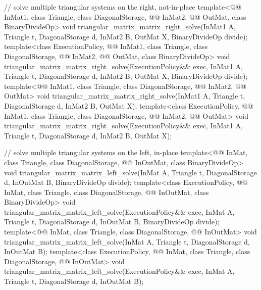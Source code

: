 \begin{codeblock}
{  // solve multiple triangular systems on the right, not-in-place
  template<@@ InMat1, class Triangle, class DiagonalStorage,
           @@ InMat2, @@ OutMat, class BinaryDivideOp>
    void triangular_matrix_matrix_right_solve(InMat1 A, Triangle t, DiagonalStorage d,
                                              InMat2 B, OutMat X, BinaryDivideOp divide);
  template<class ExecutionPolicy,
           @@ InMat1, class Triangle, class DiagonalStorage,
           @@ InMat2, @@ OutMat, class BinaryDivideOp>
    void triangular_matrix_matrix_right_solve(ExecutionPolicy&& exec,
                                              InMat1 A, Triangle t, DiagonalStorage d,
                                              InMat2 B, OutMat X, BinaryDivideOp divide);
  template<@@ InMat1, class Triangle, class DiagonalStorage,
           @@ InMat2, @@ OutMat>
    void triangular_matrix_matrix_right_solve(InMat1 A, Triangle t, DiagonalStorage d,
                                              InMat2 B, OutMat X);
  template<class ExecutionPolicy,
           @@ InMat1, class Triangle, class DiagonalStorage,
           @@ InMat2, @@ OutMat>
    void triangular_matrix_matrix_right_solve(ExecutionPolicy&& exec,
                                              InMat1 A, Triangle t, DiagonalStorage d,
                                              InMat2 B, OutMat X);

  // solve multiple triangular systems on the left, in-place
  template<@@ InMat, class Triangle, class DiagonalStorage,
           @@ InOutMat, class BinaryDivideOp>
    void triangular_matrix_matrix_left_solve(InMat A, Triangle t, DiagonalStorage d,
                                             InOutMat B, BinaryDivideOp divide);
  template<class ExecutionPolicy,
           @@ InMat, class Triangle, class DiagonalStorage,
           @@ InOutMat, class BinaryDivideOp>
    void triangular_matrix_matrix_left_solve(ExecutionPolicy&& exec,
                                             InMat A, Triangle t, DiagonalStorage d,
                                             InOutMat B, BinaryDivideOp divide);
  template<@@ InMat, class Triangle, class DiagonalStorage, @@ InOutMat>
    void triangular_matrix_matrix_left_solve(InMat A, Triangle t, DiagonalStorage d,
                                             InOutMat B);
  template<class ExecutionPolicy,
           @@ InMat, class Triangle, class DiagonalStorage, @@ InOutMat>
    void triangular_matrix_matrix_left_solve(ExecutionPolicy&& exec,
                                             InMat A, Triangle t, DiagonalStorage d,
                                             InOutMat B);

}
\end{codeblock}
